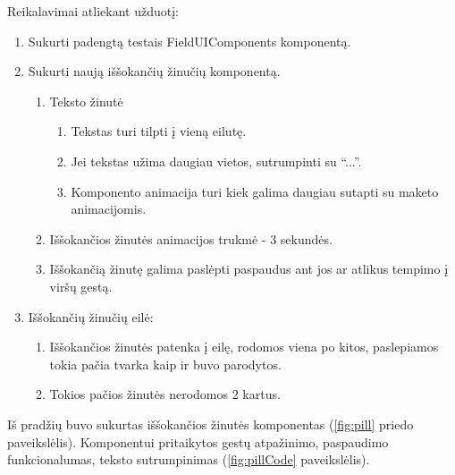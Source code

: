 Reikalavimai atliekant užduotį:
\begin{enumerate}
    \item Sukurti padengtą testais FieldUIComponents komponentą.
    \item Sukurti naują iššokančių žinučių komponentą.
    \begin{enumerate}
        \item Teksto žinutė
        \begin{enumerate}
            \item Tekstas turi tilpti į vieną eilutę.
            \item Jei tekstas užima daugiau vietos, sutrumpinti su \enquote{...}.
            \item Komponento animacija turi kiek galima daugiau sutapti su maketo animacijomis.
        \end{enumerate}
        \item Iššokančios žinutės animacijos trukmė - 3 sekundės.
        \item Iššokančią žinutę galima paslėpti paspaudus ant jos ar atlikus tempimo į viršų gestą.
    \end{enumerate}
    \item Iššokančių žinučių eilė:
    \begin{enumerate}
        \item Iššokančios žinutės patenka į eilę, rodomos viena po kitos, paslepiamos tokia pačia tvarka kaip ir buvo parodytos.
        \item Tokios pačios žinutės nerodomos 2 kartus.
    \end{enumerate}
\end{enumerate}
\newpage
Iš pradžių buvo sukurtas iššokančios žinutės komponentas (\ref{fig:pill} priedo paveikslėlis). Komponentui pritaikytos gestų atpažinimo, paspaudimo funkcionalumas, teksto sutrumpinimas (\ref{fig:pillCode} paveikslėlis).

